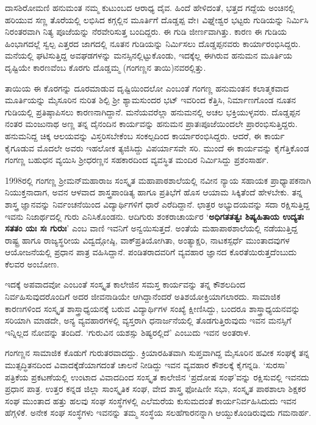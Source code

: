 {ದಾಸಶಿರೋಮಣಿ ಹನುಮಂತ ನಮ್ಮ ಕುಟುಂಬದ ಆರಾಧ್ಯ ದೈವ. ಹಿಂದೆ ಹೇಳಿದಂತೆ, ಭತ್ತದ ಗದ್ದೆಯ ಅಂಚಿನಲ್ಲಿ ಹರಿಯುವ ಸಣ್ಣ ತೊರೆಯಲ್ಲಿ ಲಭಿಸಿದ ಕಗ್ಗಲ್ಲಿನ ಮೂರ್ತಿಗೆ ದೊಡ್ಡಪ್ಪ ವೇ। ವಿಘ್ನೇಶ್ವರ ಭಟ್ಟರು ಗುಡಿಯನ್ನು ನಿರ್ಮಿಸಿ ನಿರಂತರವಾಗಿ ನಿತ್ಯ ಪೂಜೆಯನ್ನು ನೆರವೇರಿಸುತ್ತ ಬಂದಿದ್ದರು. ಈ ಗುಡಿ ಜೀರ್ಣವಾಗಿತ್ತು. ಕಾರಣ ಈ ಗುಡಿಯ ಹಿಂಭಾಗದಲ್ಲೆ ಸ್ವಲ್ಪ ಎತ್ತರದ ಜಾಗದಲ್ಲಿ ನೂತನ ಗುಡಿಯನ್ನು ನಿರ್ಮಿಸಲು ದೊಡ್ಡಪ್ಪನವರು ಕಾರ್ಯಾರಂಭಿಸಿದ್ದರು. ಮನೆಯಲ್ಲಿ ಘಟಿಸುತ್ತಿದ್ದ ಅವಘಡಗಳನ್ನು ಮನಸ್ಸಿನಲ್ಲಿಟ್ಟುಕೊಂಡು, ಇದಕ್ಕೆಲ್ಲ ಈಗಿರುವ ಹನುಮನ ಮೂರ್ತಿಯ ದೃಷ್ಟಿಯೇ ಕಾರಣ\-ವೆಂಬ ಕೊರಗು ದೊಡ್ಡಮ್ಮ (ಗಂಗಣ್ಣನ ತಾಯಿ)ನವರಲ್ಲಿತ್ತು. 

ತಾಯಿಯ ಈ ಕೊರಗನ್ನು ದೂರಮಾಡುವ ದೃಷ್ಟಿಯಿಂದಲೋ ಎಂಬಂತೆ ಗಂಗಣ್ಣ ಹನುಮಂತನ ಕಲಾತ್ಮಕವಾದ ಮೂರ್ತಿಯನ್ನು ಮೈಸೂರಿನ ನುರಿತ ಶಿಲ್ಪಿ ಶ್ರೀ ಶ್ಯಾಮಸುಂದರ ಭಟ್ ಇವರಿಂದ ಕೆತ್ತಿಸಿ, ನಿರ್ಮಾಣಗೊಂಡ ನೂತನ ಗುಡಿಯಲ್ಲಿ ಪ್ರತಿಷ್ಠಾ\-ಪಿಸಲು ಕಾರಣನಾಗಿದ್ದಾನೆ. ಮನೆಯವರೆಲ್ಲಾ ಹನುಮನಲ್ಲಿ ಅಚಲ ಭಕ್ತಿಯುಳ್ಳವರು. ದೊಡ್ಡಪ್ಪನ ನಂತರ ಮಂಜುನಾಥ ಅಣ್ಣ ತನ್ನ ದೈನಂದಿನ ಕಾರ್ಯವನ್ನು \hbox{ಹನುಮನ} ಪ್ರಾತಃಪೂಜೆಯಿಂದಲೇ ಪ್ರಾರಂಭಿಸುತ್ತಿದ್ದರು. ಹನುಮನಿದ್ದ ಚಿಕ್ಕ ಆಲಯವನ್ನು ವಿಸ್ತರಿಸ\-ಬೇಕೆಂಬ ಸಂಕಲ್ಪದಿಂದ ಕಾರ್ಯಾರಂಭಿಸಿದ್ದರು. ಆದರೆ, ಈ ಕಾರ್ಯ ಕೈಗೂಡುವ ಮೊದಲೇ ಅವರು ಇಹಲೋಕ ತ್ಯಜಿಸಿದ್ದು ವಿಪರ್ಯಾಸವೇ ಸರಿ. ಮುಂದೆ ಈ ಕಾರ್ಯವನ್ನು ಕೈಗೆತ್ತಿಕೊಂಡ ಗಂಗಣ್ಣ ಬಹುಧನ ವ್ಯಯಿಸಿ ಶ್ರೀಧರಣ್ಣನ ಸಹಕಾರದಿಂದ ವ್ಯವಸ್ಥಿತ ಮಂದಿರ ನಿರ್ಮಿಸಿದ್ದು ಪ್ರಶಂಸಾರ್ಹ.

1998ರಲ್ಲಿ ಗಂಗಣ್ಣ ಶ್ರೀಮನ್‍ಮಹಾರಾಜ ಸಂಸ್ಕೃತ ಮಹಾಪಾಠಶಾಲೆಯಲ್ಲಿ ನವೀನ ನ್ಯಾಯ ಸಹಾಯಕ ಪ್ರಾಧ್ಯಾಪಕನಾಗಿ ನಿಯುಕ್ತನಾದಾಗ, ಅವನ ಆಳವಾದ ಶಾಸ್ತ್ರಪಾಂಡಿತ್ಯ ಹಾಗೂ ಪ್ರತಿಭೆಗೆ ಹೊಸ ಆಯಾಮ ಸಿಕ್ಕಿತೆಂದೆ ಹೇಳಬೇಕು. ತನ್ನ ಶಾಸ್ತ್ರ ಜ್ಞಾನವನ್ನು ನಿರ್ವಂಚನೆಯಿಂದ ವಿದ್ಯಾರ್ಥಿಗಳಿಗೆ ಧಾರೆ ಎರೆದಿದ್ದಾನೆ. ಛಾತ್ರರ ಅಭ್ಯುದಯವನ್ನು ಸದಾ ರಕ್ಷಿಸುತ್ತಿದ್ದ  ಇವನು ನಿಜಾರ್ಥದಲ್ಲಿ ಗುರು ಎನಿಸಿಕೊಂಡನು. \hbox{ಆದಿಗುರು} ಶಂಕರಾಚಾರ್ಯರ   \enginline{-}   ‘\textbf{ಅಧಿಗತತತ್ವಃ ಶಿಷ್ಯಹಿತಾಯ ಉದ್ಯತಃ ಸತತಂ ಯಃ ಸಃ ಗುರುಃ}’ ಎಂಬ ವಾಣಿ ಇವನಿಗೆ ಅನ್ವಯಿಸುತ್ತದೆ. ಅಂತೆಯೆ ಮಹಾಪಾಠಶಾಲೆಯಲ್ಲಿ ನಡೆಯುತ್ತಿದ್ದ ರಾಷ್ಟ್ರ ಹಾಗೂ ರಾಜ್ಯಸ್ಥರೀಯ ವಿದ್ವದ್ಗೋಷ್ಠಿ, ವಾಕ್‍ಪ್ರತಿಯೋಗಿತಾ, ಅಂತ್ಯಾಕ್ಷರಿ, ನಾಟಕಸ್ಪರ್ಧೆ ಮುಂತಾದವುಗಳ ಆಯೋಜನೆಯಲ್ಲಿ ಪ್ರಧಾನ ಪಾತ್ರ ವಹಿಸಿದ್ದಾನೆ. ಪಂಡಿತರಾದವರಿಗೆ ವ್ಯವಹಾರ ಜ್ಞಾನದ ಕೊರತೆಯಿರುತ್ತದೆಂಬುದು ಕೆಲವರ ಅಂಬೋಣ. 

ಇದಕ್ಕೆ ಅಪವಾದವೋ ಎಂಬಂತೆ ಸಂಸ್ಕೃತ ಕಾಲೇಜಿನ ಸಮಸ್ತ ಕಾರ್ಯವನ್ನು ತನ್ನ ಕೌಶಲದಿಂದ ನಿರ್ವಹಿಸುವುದರೊಂದಿಗೆ ಅದರ ಜೀವನಾಡಿಯೇ ಆಗಿದ್ದಾನೆಂದರೆ ಅತಿಶಯೋಕ್ತಿಯಾಗಲಾರದು. ಸಾಮಾಜಿಕ ಕಾರಣಗಳಿಂದ ಸಂಸ್ಕೃತ ಶಾಸ್ತ್ರಾಧ್ಯಯನಕ್ಕೆ ಬರುವ ವಿದ್ಯಾರ್ಥಿಗಳ ಸಂಖ್ಯೆ ಕ್ಷೀಣಿಸಿದ್ದು, ಬಂದರೂ ಶಾಸ್ತ್ರಾಧ್ಯಯನವನ್ನು ಸರಿಯಾಗಿ ಮಾಡದೇ, ಅನ್ಯ ವ್ಯವಹಾರಗಳಲ್ಲಿ ವ್ಯಸ್ತರಾಗಿ ಧನಾರ್ಜನೆಯಲ್ಲಿ ತೊಡಗುತ್ತಿರುವುದು ಇವನ ಮನಸ್ಸಿಗೆ ಇನ್ನಿಲ್ಲದ ನೋವನ್ನು ತಂದಿದೆ. ‘ಗುರುವಿನ ಯಶಸ್ಸು ಶಿಷ್ಯರಲ್ಲಿದೆ’ ಎಂಬುದು ಇವನ ಅಂತರಾಳ.

ಗಂಗಣ್ಣನ ಸಾಮಾಜಿಕ ಕೊಡುಗೆ ಗುರುತರವಾದದ್ದು. ಕ್ರಿಯಾರಹಿತವಾಗಿ ಸುಪ್ತವಾಗಿದ್ದ ಮೈಸೂರಿನ ಹವೀಕ ಸಂಘಕ್ಕೆ ತನ್ನ ಮುತ್ಸದ್ಧಿತನದಿಂದ ವಿವಾದಕ್ಕೆಡೆಯಾಗದಂತೆ ಚಾಲನೆ ನೀಡಿದ್ದು ಇವನ ವ್ಯವಹಾರ ಕೌಶಲಕ್ಕೆ ಕೈಗನ್ನಡಿ. ‘ಸುರಸಾ’  \enginline{-}  \hbox{ಪತ್ರಿಕೆಯ} ಪ್ರಕಟಣೆ\-ಯಲ್ಲಿ ಉಂಟಾದ ವಿವಾದದಿಂದ ಸಂಸ್ಕೃತ ಕಾಲೇಜಿನ ‘ಪ್ರದೋಷ ಸಂಘ’ವನ್ನು ರಕ್ಷಿಸುವಲ್ಲಿ ಇವನದು ಪ್ರಧಾನ ಪಾತ್ರ. ಉತ್ತರ ಕನ್ನಡ ಜಿಲ್ಲಾ ಸಾಂಸ್ಕೃತಿಕ ಸಂಘ, ವೇದ ಶಾಸ್ತ್ರ  ಫೋಷಿಣೀ ಸಭಾ, ಸಂಸ್ಕೃತ ಪಾಠಶಾಲಾ ಶಿಕ್ಷಕರ ಸಂಘ ಮುಂತಾದ ಹತ್ತು ಹಲವು ಸಂಘ  \enginline{-}  ಸಂಸ್ಥೆಗಳಲ್ಲಿ ಎಲೆಮರೆಯ ಕುಸುಮದಂತೆ ಕಾರ್ಯನಿರ್ವಹಿಸಿದುದು ಇವನ ಹೆಗ್ಗಳಿಕೆ. ಅನೇಕ ಸಂಘ  \enginline{-}  ಸಂಸ್ಥೆಗಳು ಇವನನ್ನು ತಮ್ಮ ಸಂಸ್ಥೆಯ ಸಲಹೆಗಾರನನ್ನಾಗಿ ಆಯ್ದುಕೊಂಡಿರುವುದು ಗಮನಾರ್ಹ.

}
